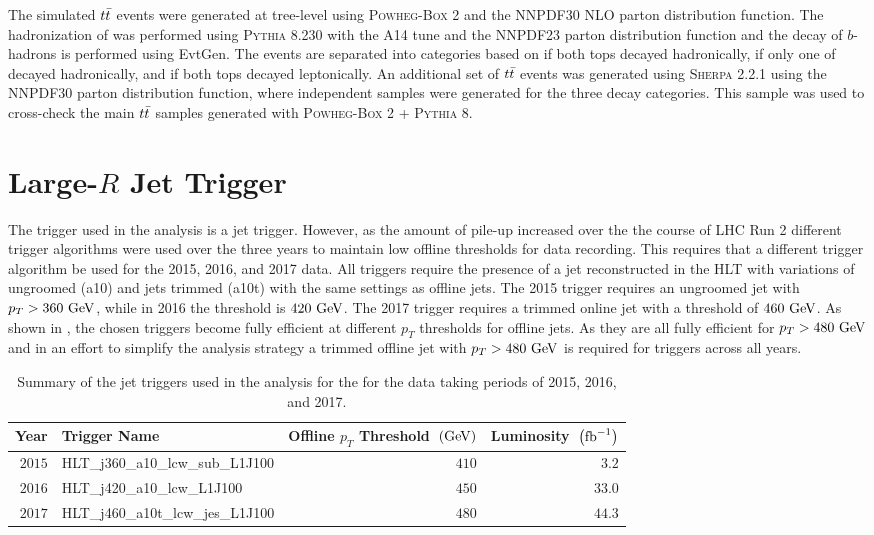 The simulated $t\bar{t}$ events were generated at tree-level using \textsc{Powheg-Box} 2 and the NNPDF30 NLO parton distribution function.
The hadronization of was performed using \textsc{Pythia} 8.230 with the A14 tune and the NNPDF23 parton distribution function and the decay of $b$-hadrons is performed using EvtGen.
The events are separated into categories based on if both tops decayed hadronically, if only one of decayed hadronically, and if both tops decayed leptonically.
An additional set of $t\bar{t}$ events was generated using \textsc{Sherpa} 2.2.1 using the NNPDF30 parton distribution function, where independent samples were generated for the three decay categories.
This sample was used to cross-check the main $t\bar{t}$ samples generated with \textsc{Powheg-Box} 2 + \textsc{Pythia} 8.

\section{Large-$R$ Jet Trigger}\label{sec:analysis_trigger}

The trigger used in the analysis is a \largeR{} jet trigger.
However, as the amount of pile-up increased over the the course of LHC Run 2 different \largeR{} trigger algorithms were used over the three years to maintain low offline thresholds for data recording.
This requires that a different trigger algorithm be used for the 2015, 2016, and 2017 data.
All triggers require the presence of a \largeR{} jet reconstructed in the \gls{HLT} with variations of ungroomed (a10) and \largeR{} jets trimmed (a10t) with the same settings as offline \largeR{} jets.
The 2015 trigger requires an ungroomed \largeR{} jet with $p_{T} > 360~\mathrm{GeV}$, while in 2016 the threshold is $420~\mathrm{GeV}$.
The 2017 trigger requires a trimmed online jet with a threshold of $460~\mathrm{GeV}$.
As shown in , the chosen triggers become fully efficient at different $p_{T}$ thresholds for offline \largeR{} jets.
As they are all fully efficient for $p_{T} > 480~\mathrm{GeV}$ and in an effort to simplify the analysis strategy a trimmed offline jet with $p_{T} > 480~\mathrm{GeV}$ is required for triggers across all years.

\begin{table}[htpb]
 \centering
 \caption[Summary of the triggers used in the analysis.]{%
  Summary of the \largeR{} jet triggers used in the analysis for the for the data taking periods of 2015, 2016, and 2017.}
 \begin{tabular}{@{}rlrr@{}}
  \toprule
  Year   & Trigger Name                 & Offline $p_{T}$ Threshold~$(\mathrm{GeV})$ & Luminosity~$\left(\mathrm{fb}^{-1}\right)$ \\ \midrule
  $2015$ & HLT_j360_a10_lcw_sub_L1J100  & $410$                              & $3.2$                          \\
  $2016$ & HLT_j420_a10_lcw_L1J100      & $450$                              & $33.0$                         \\
  $2017$ & HLT_j460_a10t_lcw_jes_L1J100 & $480$                              & $44.3$                         \\
  \bottomrule
 \end{tabular}
 \label{table:annual_triggers}
\end{table}

